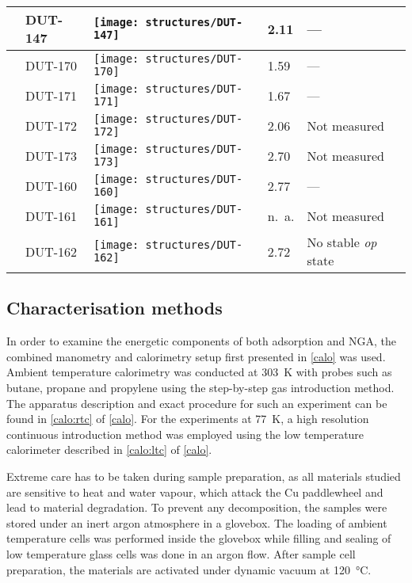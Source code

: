 \begin{table}[p]
\begin{tabularx}{\linewidth}{M{1cm} | Y >{\centering}m{5cm} Y p{2.5cm}}
        & DUT-147  & 
            \texttt{[image: structures/DUT-147]}
            & 2.11 & --- \\
        \midrule
         &
        DUT-170  & 
            \texttt{[image: structures/DUT-170]}
            & 1.59 & --- \\
        & DUT-171  & 
            \texttt{[image: structures/DUT-171]}
            & 1.67 & --- \\
        & DUT-172  & 
            \texttt{[image: structures/DUT-172]}
            & 2.06 & Not measured \\
        & DUT-173  & 
            \texttt{[image: structures/DUT-173]}
            & 2.70 & Not measured \\
        \midrule
         &
        DUT-160  & 
            \texttt{[image: structures/DUT-160]}
            & 2.77 & --- \\
        & DUT-161  & 
            \texttt{[image: structures/DUT-161]}
            & n.\ a. & Not measured \\
        & DUT-162  & 
            \texttt{[image: structures/DUT-162]}
            & 2.72 & No stable \textit{op} state \\
        \bottomrule
	\end{tabularx}%
	\label{dut:tbl:materials}
\end{table}%

\subsection{Characterisation methods}

In order to examine the energetic components of both adsorption and 
\gls{NGA}, the combined manometry and calorimetry setup first 
presented in \autoref{calo} was used. Ambient temperature calorimetry
was conducted at \SI{303}{\kelvin} with probes such as butane, propane
and propylene using the step-by-step gas introduction method. 
The apparatus description and exact procedure for such an experiment 
can be found in \autoref{calo:rtc} of \autoref{calo}.
For the experiments at \SI{77}{\kelvin}, a high resolution continuous
introduction method was employed using the low temperature calorimeter
described in \autoref{calo:ltc} of \autoref{calo}.

Extreme care has to be taken during sample preparation, as all materials 
studied are sensitive to heat and water vapour, which attack
the Cu paddlewheel and lead to material degradation. To prevent any 
decomposition, the samples were stored under an inert argon 
atmosphere in a glovebox. The loading of ambient temperature 
cells was performed inside the glovebox while filling and sealing 
of low temperature glass cells was done in an argon flow. After 
sample cell preparation, the materials are activated under 
dynamic vacuum at \SI{120}{\degreeCelsius}. 

